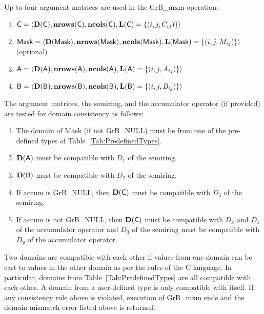 Up to four argument matrices are used in the {\sf GrB\_mxm} operation:
\begin{enumerate}
	\item ${\sf C} = \langle \bold{D}({\sf C}),\bold{nrows}({\sf C}),\bold{ncols}({\sf C}),\bold{L}({\sf C}) = \{(i,j,C_{ij}) \} \rangle$
	\item ${\sf Mask} = \langle \bold{D}({\sf Mask}),\bold{nrows}({\sf Mask}),\bold{ncols}({\sf Mask}),\bold{L}({\sf Mask}) = \{(i,j,M_{ij}) \} \rangle$ (optional)
	\item ${\sf A} = \langle \bold{D}({\sf A}),\bold{nrows}({\sf A}), \bold{ncols}({\sf A}),\bold{L}({\sf A}) = \{(i,j,A_{ij}) \} \rangle$
	\item ${\sf B} = \langle \bold{D}({\sf B}),\bold{nrows}({\sf B}), \bold{ncols}({\sf B}),\bold{L}({\sf B}) = \{(i,j,B_{ij}) \} \rangle$
\end{enumerate}

The argument matrices, the semiring, and the accumulator operator (if provided) are tested for domain consistency
as follows:
\begin{enumerate}
	\item The domain of {\sf Mask} (if not {\sf GrB\_NULL}) must be from one of the pre-defined types of Table~\ref{Tab:PredefinedTypes}.

	\item $\bold{D}({\sf A})$ must be compatible with $D_1$ of the semiring.

	\item $\bold{D}({\sf B})$ must be compatible with $D_2$ of the semiring.

	\item If {\sf accum} is {\sf GrB\_NULL}, then $\bold{D}({\sf C})$ must be compatible with $D_3$ of the semiring.

	\item If {\sf accum} is not {\sf GrB\_NULL}, then $\bold{D}({\sf C})$ must be compatible with $D_x$ and $D_z$ of the 
	accumulator operator and $D_3$ of the semiring must be compatible with $D_y$ of the accumulator operator.
\end{enumerate}
Two domains are compatible with each other if values from one domain can be cast to values in the other domain as per the rules of the C language.
In particular, domains from Table~\ref{Tab:PredefinedTypes} are all compatible with each other. A domain from a user-defined type is only compatible with itself.
If any consistency rule above is violated, execution of {\sf GrB\_mxm} ends and the domain mismatch error listed above is returned.

